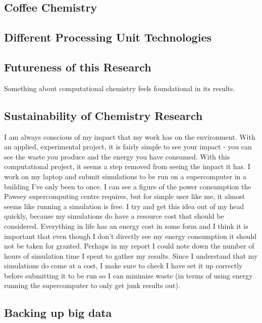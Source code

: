 \documentclass[11pt]{article}
\begin{document}
\subsection{Coffee Chemistry}
\subsection{Different Processing Unit Technologies}
\subsection{Futureness of this Research}

Something about computational chemistry feels foundational in its results.

\subsection{Sustainability of Chemistry Research}

I am always conscious of my impact that my work has on the environment. With an applied, experimental project, it is fairly simple to see your impact - you can see the waste you produce and the energy you have consumed. With this computational project, it seems a step removed from seeing the impact it has. I work on my laptop and submit simulations to be run on a supercomputer in a building I've only been to once. I can see a figure of the power consumption the Pawsey supercomputing centre requires, but for simple user like me, it almost seems like running a simulation is free. I try and get this idea out of my head quickly, because my simulations do have a resource cost that should be considered. Everything in life has an energy cost in some form and I think it is important that even though I don't directly see my energy consumption it should not be taken for granted. Perhaps in my report I could note down the number of hours of simulation time I spent to gather my results. Since I understand that my simulations do come at a cost, I make sure to check I have set it up correctly before submitting it to be run so I can minimise waste (in terms of using energy running the supercomputer to only get junk results out).

\subsection{Backing up big data}
\end{document}
